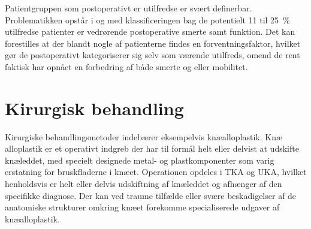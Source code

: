 Patientgruppen som postoperativt er utilfredse er svært definerbar. Problematikken opstår i og med klassificeringen bag de potentielt 11 til 25~\% utilfredse patienter er vedrørende postoperative smerte samt funktion. Det kan forestilles at der blandt nogle af patienterne findes en forventningsfaktor, hvilket gør de postoperativt kategoriserer sig selv som værende utilfreds, omend de rent faktisk har opnået en forbedring af både smerte og eller mobilitet.


\section{Kirurgisk behandling}
Kirurgiske behandlingsmetoder indebærer eksempelvis knæalloplastik. Knæ alloplastik er et operativt indgreb der har til formål helt eller delvist at udskifte knæleddet, med specielt designede metal- og plastkomponenter som varig erstatning for bruskfladerne i knæet. Operationen opdeles i TKA og UKA, hvilket henholdsvis er helt eller delvis udskiftning af knæleddet og afhænger af den specifikke diagnose. Der kan ved traume tilfælde eller svære beskadigelser af de anatomiske strukturer omkring knæet forekomme specialiserede udgaver af knæalloplastik.

